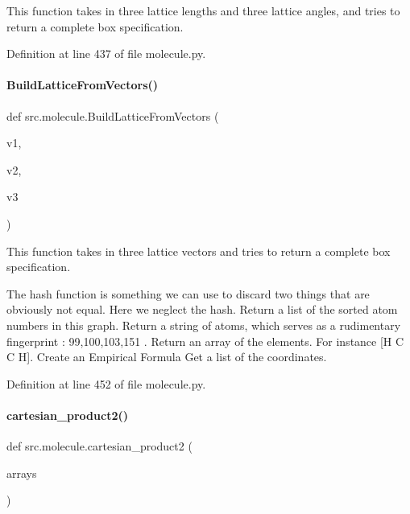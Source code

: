 This function takes in three lattice lengths and three lattice angles, and tries to return a complete box specification. 



Definition at line 437 of file molecule.\+py.

\mbox{\label{namespacesrc_1_1molecule_a49fbd57aae59219cb5fb85c22362b1f3}} 
\paragraph{\texorpdfstring{Build\+Lattice\+From\+Vectors()}{BuildLatticeFromVectors()}}
{\footnotesize\ttfamily def src.\+molecule.\+Build\+Lattice\+From\+Vectors (\begin{DoxyParamCaption}\item[{}]{v1,  }\item[{}]{v2,  }\item[{}]{v3 }\end{DoxyParamCaption})}



This function takes in three lattice vectors and tries to return a complete box specification. 

The hash function is something we can use to discard two things that are obviously not equal. Here we neglect the hash. Return a list of the sorted atom numbers in this graph. Return a string of atoms, which serves as a rudimentary \textquotesingle{}fingerprint\textquotesingle{} \+: \textquotesingle{}99,100,103,151\textquotesingle{} . Return an array of the elements. For instance \mbox{[}\textquotesingle{}H\textquotesingle{} \textquotesingle{}C\textquotesingle{} \textquotesingle{}C\textquotesingle{} \textquotesingle{}H\textquotesingle{}\mbox{]}. Create an Empirical Formula Get a list of the coordinates. 

Definition at line 452 of file molecule.\+py.

\mbox{\label{namespacesrc_1_1molecule_a8d9cdc5fd67e79c8b1edac8159d2e370}} 
\paragraph{\texorpdfstring{cartesian\+\_\+product2()}{cartesian\_product2()}}
{\footnotesize\ttfamily def src.\+molecule.\+cartesian\+\_\+product2 (\begin{DoxyParamCaption}\item[{}]{arrays }\end{DoxyParamCaption})}



